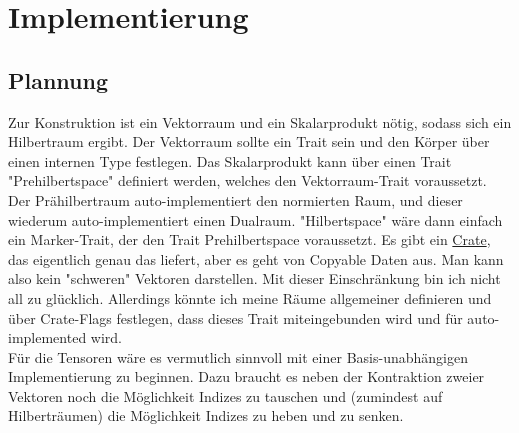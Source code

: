 \documentclass[12pt]{article}
\begin{document}
\section{Implementierung}
\subsection{Plannung}
Zur Konstruktion ist ein Vektorraum und ein Skalarprodukt nötig, sodass sich ein Hilbertraum ergibt. Der Vektorraum sollte ein Trait sein und den Körper über einen internen Type festlegen. Das Skalarprodukt kann über einen Trait "Prehilbertspace" definiert werden, welches den Vektorraum-Trait voraussetzt. Der Prähilbertraum auto-implementiert den normierten Raum, und dieser wiederum auto-implementiert einen Dualraum. "Hilbertspace" wäre dann einfach ein Marker-Trait, der den Trait Prehilbertspace voraussetzt. Es gibt ein \href{https://docs.rs/vector-space/latest/vector_space/index.html}{Crate}, das eigentlich genau das liefert, aber es geht von Copyable Daten aus. Man kann also kein "schweren" Vektoren darstellen. Mit dieser Einschränkung bin ich nicht all zu glücklich. Allerdings könnte ich meine Räume allgemeiner definieren und über Crate-Flags festlegen, dass dieses Trait miteingebunden wird und für auto-implemented wird.\\
Für die Tensoren wäre es vermutlich sinnvoll mit einer Basis-unabhängigen Implementierung zu beginnen. Dazu braucht es neben der Kontraktion zweier Vektoren noch die Möglichkeit Indizes zu tauschen und (zumindest auf Hilberträumen) die Möglichkeit Indizes zu heben und zu senken.
\end{document}
